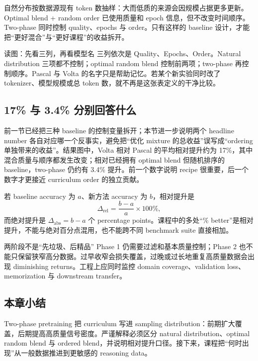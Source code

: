 自然分布按数据源现有 token 数抽样：大而低质的来源会因规模占据更多更新。Optimal blend + random order 已使用质量和 epoch 信息，但不改变时间顺序。Two-phase 同时控制 quality、epochs 与 order。只有这样的 baseline 设计，才能把“更好混合”与“更好课程”的收益拆开。


\begin{knowledgebox}{读图：先看三列，再看模型名}
三列依次是 Quality、Epochs、Order。Natural distribution 三项都不控制；optimal random blend 控制前两项；two-phase 再控制顺序。Pascal 与 Volta 的名字只是帮助记忆。若某个新实验同时改了 tokenizer、模型规模或总 token 数，就不再是这张表定义的干净比较。
\end{knowledgebox}

\subsection{17\% 与 3.4\% 分别回答什么}

前一节已经把三种 baseline 的控制变量拆开；本节进一步说明两个 headline number 各自对应哪一个反事实，避免把“优化 mixture 的总收益”误写成“ordering 单独带来的收益”。结果图中，Volta 相对 Pascal 的平均相对提升约为 17\%，其中混合质量与顺序都发生改变；相对已经拥有 optimal blend 但随机排序的 baseline，two-phase 仍约有 3.4\% 提升。前一个数字说明 recipe 很重要，后一个数字才更接近 curriculum order 的独立贡献。


若 baseline accuracy 为 $a$、新方法 accuracy 为 $b$，相对提升是
\[
\Delta_{\mathrm{rel}}=\frac{b-a}{a}\times 100\%,
\]
而绝对提升是 $\Delta_{\mathrm{abs}}=b-a$ 个 percentage points。课程中的多处“\% better”是相对提升，不能与绝对百分点混用，也不能跨不同 benchmark suite 直接相加。


\begin{warningbox}{两阶段不是“先垃圾、后精品”}
Phase 1 仍需要过滤和基本质量控制；Phase 2 也不能只保留狭窄高分数据。过早收窄会损失覆盖，过晚或过长地重复高质量数据会出现 diminishing returns。工程上应同时监控 domain coverage、validation loss、memorization 与 downstream transfer。
\end{warningbox}

\subsection{本章小结}

Two-phase pretraining 把 curriculum 写进 sampling distribution：前期扩大覆盖，后期提高高质量信号密度。严谨解释必须区分 natural distribution、optimal random blend 与 ordered blend，并说明相对提升口径。接下来，课程把“何时出现”从一般数据推进到更敏感的 reasoning data。

